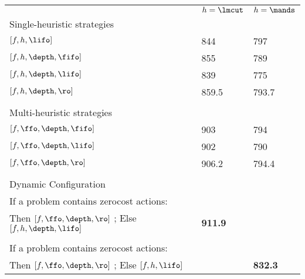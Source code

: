 \begin{center}
\begin{tabular}{|l|l|l|}
\hline
 & $h=\lmcut$ & $h=\mands$\\
Single-heuristic strategies &  & \\
$[f,h,\lifo]$ & 844 & 797\\
$[f,h,\depth,\fifo]$ & 855 & 789\\
$[f,h,\depth,\lifo]$ & 839 & 775\\
$[f,h,\depth,\ro]$ & 859.5 & 793.7\\
 &  & \\
Multi-heuristic strategies &  & \\
$[f,\ffo,\depth,\fifo]$ & 903 & 794\\
$[f,\ffo,\depth,\lifo]$ & 902 & 790\\
$[f,\ffo,\depth,\ro]$ & 906.2 & 794.4\\
 &  & \\
Dynamic Configuration &  & \\
If a problem contains zerocost actions: &  & \\
Then $[f,\ffo,\depth,\ro]$ ; Else $[f,h,\depth,\lifo]$ & \textbf{911.9} & \\
 &  & \\
If a problem contains zerocost actions: &  & \\
Then $[f,\ffo,\depth,\ro]$ ; Else $[f,h,\lifo]$ &  & \textbf{832.3}\\
\hline
\end{tabular}
\end{center}
